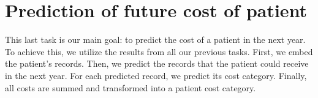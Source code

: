 


\newpage

\section{Prediction of future cost of patient}
\label{pat_fut_pred_met}

This last task is our main goal: to predict the cost of a patient in the next year. To achieve this, we utilize the results from all our previous tasks. First, we embed the patient’s records. Then, we predict the records that the patient could receive in the next year. For each predicted record, we predict its cost category. Finally, all costs are summed and transformed into a patient cost category.
